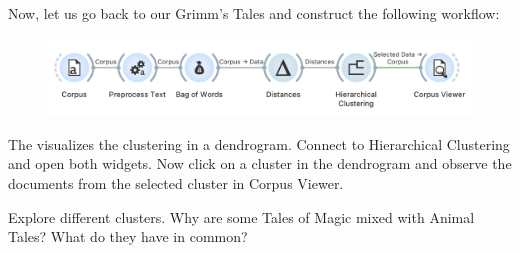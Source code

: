 Now, let us go back to our Grimm's Tales and construct the following workflow:

\vspace{-0.2cm}
\begin{figure}[h]
  \centering
  \includegraphics[width=0.9\linewidth]{workflow.png}%
  \caption{}
\end{figure}
\vspace{-0.3cm}

The  visualizes the clustering in a dendrogram. Connect  to Hierarchical Clustering and open both widgets. Now click on a cluster in the dendrogram and observe the documents from the selected cluster in Corpus Viewer.

Explore different clusters. Why are some Tales of Magic mixed with Animal Tales? What do they have in common?

\begin{figure}[h]
    \centering
    \caption{$\;$}
\end{figure}


